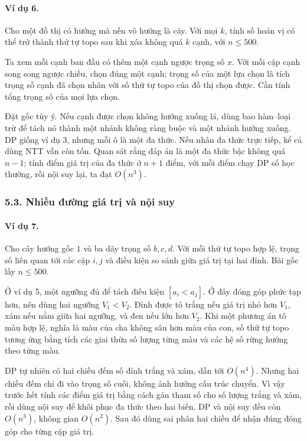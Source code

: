 \documentclass[11pt]{article}
\begin{document}
\paragraph{Ví dụ 6.}
Cho một đồ thị có hướng mà nền vô hướng là cây. Với mọi \(k\), tính số hoán vị
có thể trở thành thứ tự topo sau khi xóa không quá \(k\) cạnh, với \(n\le 500\).

Ta xem mỗi cạnh ban đầu có thêm một cạnh ngược trọng số \(x\). Với mỗi cặp cạnh
song song ngược chiều, chọn đúng một cạnh; trọng số của một lựa chọn là tích
trọng số cạnh đã chọn nhân với số thứ tự topo của đồ thị chọn được. Cần tính
tổng trọng số của mọi lựa chọn.

Đặt gốc tùy ý. Nếu cạnh được chọn không hướng xuống lá, dùng bao hàm--loại trừ
để tách nó thành một nhánh không ràng buộc và một nhánh hướng xuống. DP giống
ví dụ 3, nhưng mỗi ô là một đa thức. Nếu nhân đa thức trực tiếp, kể cả dùng NTT
vẫn còn tốn. Quan sát rằng đáp án là một đa thức bậc không quá \(n-1\); tính
điểm giá trị của đa thức ở \(n+1\) điểm, với mỗi điểm chạy DP số học thường,
rồi nội suy lại, ta đạt \(O(n^3)\).

\subsubsection*{5.3. Nhiều đường giá trị và nội suy}

\paragraph{Ví dụ 7.}
Cho cây hướng gốc \(1\) và ba dãy trọng số \(b,c,d\). Với mỗi thứ tự topo hợp
lệ, trọng số liên quan tới các cặp \(i,j\) và điều kiện so sánh giữa giá trị
tại hai đỉnh. Bài gốc lấy \(n\le 500\).

Ở ví dụ 5, một ngưỡng đủ để tách điều kiện \([a_i<a_j]\). Ở đây đóng góp phức
tạp hơn, nên dùng hai ngưỡng \(V_1<V_2\). Đỉnh được tô trắng nếu giá trị nhỏ
hơn \(V_1\), xám nếu nằm giữa hai ngưỡng, và đen nếu lớn hơn \(V_2\). Khi một
phương án tô màu hợp lệ, nghĩa là màu của cha không sâu hơn màu của con, số thứ
tự topo tương ứng bằng tích các giai thừa số lượng từng màu và các hệ số rừng
hướng theo từng màu.

DP tự nhiên có hai chiều đếm số đỉnh trắng và xám, dẫn tới \(O(n^4)\). Nhưng
hai chiều đếm chỉ đi vào trọng số cuối, không ảnh hưởng cấu trúc chuyển. Vì
vậy trước hết tính các điểm giá trị bằng cách gán tham số cho số lượng trắng và
xám, rồi dùng nội suy để khôi phục đa thức theo hai biến. DP và nội suy đều
còn \(O(n^3)\), không gian \(O(n^2)\). Sau đó dùng sai phân hai chiều để nhận
đúng đóng góp cho từng cặp giá trị.
\end{document}
